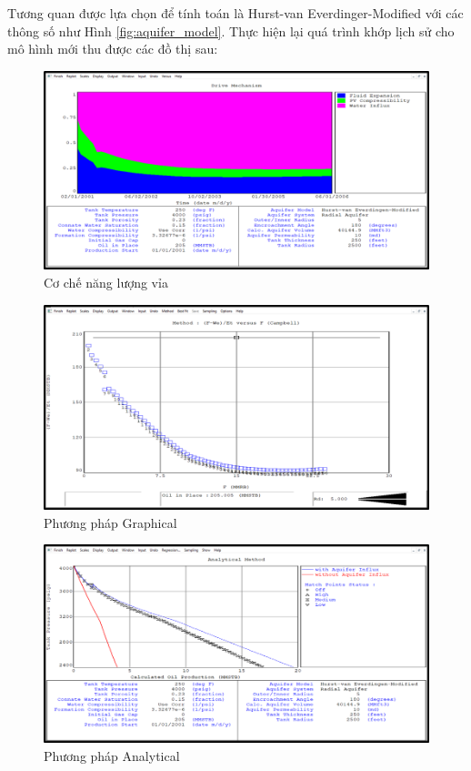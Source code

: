 \documentclass[12pt,a4paper]{report}
\begin{document}
Tương quan được lựa chọn để tính toán là Hurst-van Everdinger-Modified với các thông số như Hình \ref{fig:aquifer_model}.
		\newpage
        \noindent
Thực hiện lại quá trình khớp lịch sử cho mô hình mới thu được các đồ thị sau:
        \begin{figure}[h]
        	\centering
            \includegraphics[scale=0.6]{Fig/ener_aquifer.png}
            \caption{Cơ chế năng lượng vỉa}
            \label{fig:ener_aquifer}
        \end{figure}
        \begin{figure}[h]
        	\centering
            \includegraphics[scale=0.6]{Fig/gra_aquifer.png}
            \caption{Phương pháp Graphical}
            \label{fig:gra_aquifer}
        \end{figure}
        \begin{figure}[h]
        	\centering
            \includegraphics[scale=0.6]{Fig/ana_aquifer.png}
            \caption{Phương pháp Analytical}
            \label{fig:ana_aquifer}
        \end{figure}
\end{document}
